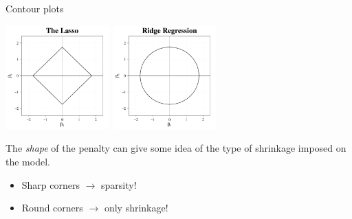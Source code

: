\documentclass[8pt]{beamer}
\begin{document}
\begin{frame}[noframenumbering]{\color{white} Contour plots}

\begin{center}
    \centering
    \includegraphics[width = 0.3\textwidth]{cont_lasso.pdf}
    \includegraphics[width = 0.3\textwidth]{cont_ridge.pdf}
\end{center}
The \textit{shape} of the penalty can give some idea of the type of shrinkage imposed on the model.
\begin{itemize}
    \item Sharp corners $\to$ sparsity! \Laughey[1.5][yellow][pink]
    \item Round corners $\to$ only shrinkage!
\end{itemize}
    
\end{frame}
\end{document}
